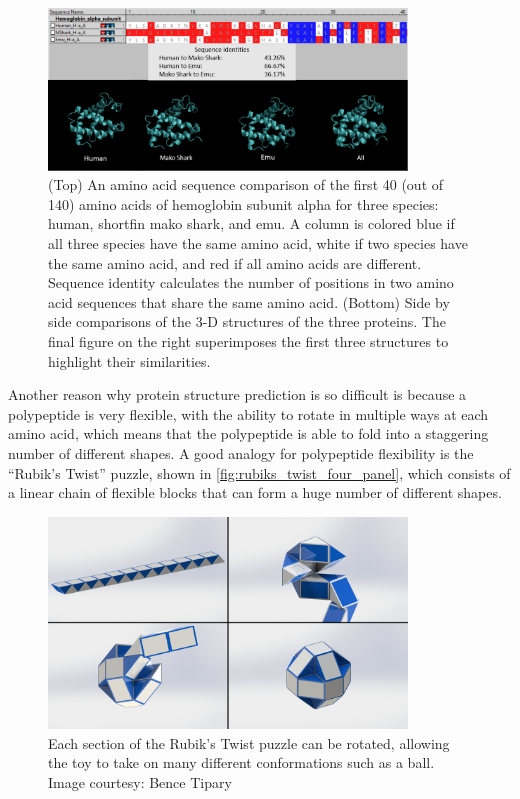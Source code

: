 \begin{figure}[h]
	\centering
	\mySfFamily
	\includegraphics[width = 0.85\textwidth]{../images/SequenceStructureExample.png}
	\caption{(Top) An amino acid sequence comparison of the first 40 (out of 140) amino acids of hemoglobin subunit alpha for three species: human, shortfin mako shark, and emu. A column is colored blue if all three species have the same amino acid, white if two species have the same amino acid, and red if all amino acids are different. Sequence identity calculates the number of positions in two amino acid sequences that share the same amino acid. (Bottom) Side by side comparisons of the 3-D structures of the three proteins. The final figure on the right superimposes the first three structures to highlight their similarities.}
	\label{fig:SequenceStructureExample}
\end{figure}

Another reason why protein structure prediction is so difficult is because a polypeptide is very flexible, with the ability to rotate in multiple ways at each amino acid, which means that the polypeptide is able to fold into a staggering number of different shapes. A good analogy for polypeptide flexibility is the ``Rubik's Twist'' puzzle, shown in \autoref{fig:rubiks_twist_four_panel}, which consists of a linear chain of flexible blocks that can form a huge number of different shapes.

\begin{figure}[h]
	\centering
	\mySfFamily
	\includegraphics[width = 0.85\textwidth]{../images/rubiks_twist_four_panel.jpg}
	\caption{Each section of the Rubik's Twist puzzle can be rotated, allowing the toy to take on many different conformations such as a ball. Image courtesy: Bence Tipary}
	\label{fig:rubiks_twist_four_panel}
\end{figure}

